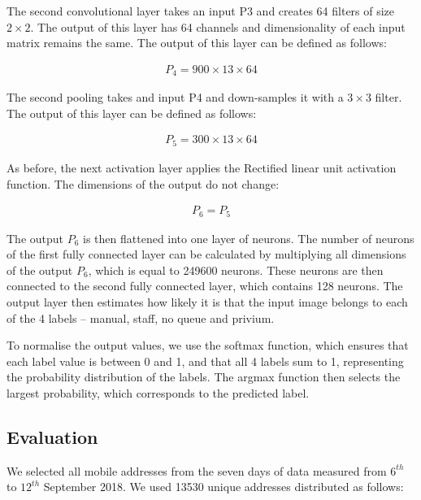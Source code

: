 \par 
The second convolutional layer takes an input P3 and creates 64 filters of size $2 \times 2$. The output of this layer has 64 channels and dimensionality of each input matrix remains the same. The output of this layer can be defined as follows:

\begin{align*}
     P_{4} = 900 \times 13 \times 64
\end{align*}

\par
The second pooling takes and input P4 and down-samples it with a $3 \times 3$ filter. The output of this layer can be defined as follows:

\begin{align*}
     P_{5} = 300 \times 13 \times 64
\end{align*}

\par
As before, the next activation layer applies the Rectified linear unit activation function. The dimensions of the output do not change:

\begin{align*}
     P_{6} = P_{5} 
\end{align*}

\par 
The output $P_{6}$ is then flattened into one layer of neurons. The number of neurons of the first fully connected layer can be calculated by multiplying all dimensions of the output  $P_{6}$, which is equal to 249600 neurons. These neurons are then connected to the second fully connected layer, which contains 128 neurons. The output layer then estimates how likely it is that the input image belongs to each of the 4 labels – manual, staff, no queue and privium.

\par 
To normalise the output values, we use the softmax function, which ensures that each label value is between 0 and 1, and that all 4 labels sum to 1, representing the probability distribution of the labels. The argmax function then selects the largest probability, which corresponds to the predicted label.

\subsection{Evaluation}

\par 
We selected all mobile addresses from the seven days of data measured from $6^{th}$ to $12^{th}$ September 2018. We used 13530 unique addresses distributed as follows:

